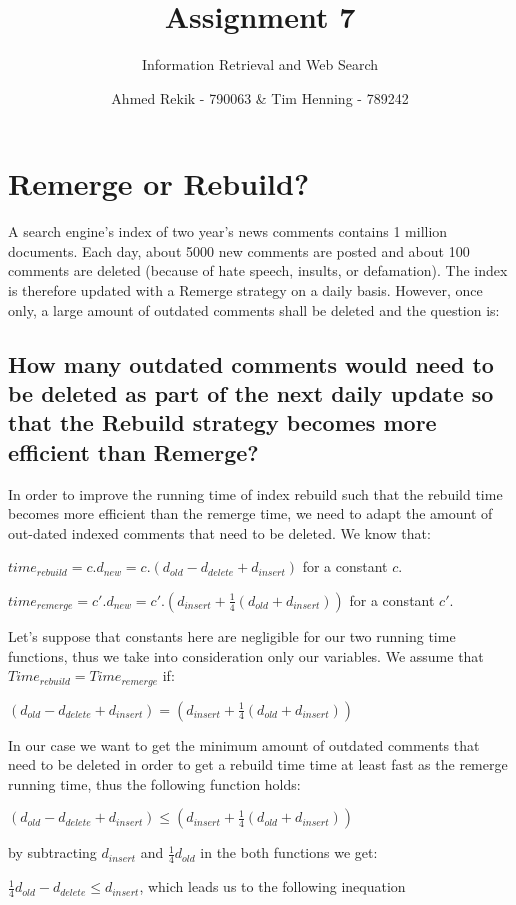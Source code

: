 \documentclass{scrartcl}
\title{Assignment 7}
\subtitle{Information Retrieval and Web Search}
\author{Ahmed Rekik - 790063 \& Tim Henning - 789242}
\begin{document}
\maketitle

\setcounter{section}{0}
\section {Remerge or Rebuild?}
A search engine’s index of two year’s news comments contains 1 million documents. Each day,
about 5000 new comments are posted and about 100 comments are deleted (because of hate
speech, insults, or defamation). The index is therefore updated with a Remerge strategy on a
daily basis. However, once only, a large amount of outdated comments shall be deleted and the
question is:
\subsection{How many outdated comments would need to be deleted as part of the next daily update
so that the Rebuild strategy becomes more efficient than Remerge?}

In order to improve the running time of index rebuild such that the rebuild time becomes more efficient than the remerge time, we need to adapt the amount of out-dated indexed comments that need to be deleted. We know that:

$time_{rebuild} = c.d_{new} = c. ( d_{old} - d_{delete} + d_{insert})$ for a constant $c$.

$time_{remerge} = c'.d_{new} = c'. (d_{insert} + \frac{1}{4}( d_{old} + d_{insert}))$ for a constant $c'$.

Let's suppose that constants here are negligible for our two running time functions, thus we take into consideration only our variables. We assume that 
$Time_{rebuild} = Time_{remerge}$ if:

$(d_{old} - d_{delete} + d_{insert}) = (d_{insert} +  \frac{1}{4} ( d_{old} + d_{insert}))$

In our case we want to get the minimum amount of outdated comments that need to be deleted in order to get a rebuild time time at least fast as the remerge running time, thus the following function holds:

$( d_{old} - d_{delete} + d_{insert}) \leq (d_{insert} + \frac{1}{4}  ( d_{old} + d_{insert}))$

by subtracting $d_{insert}$ and $\frac{1}{4} d_{old}$ in the both functions we get:

$\frac{1}{4} d_{old} - d_{delete} \leq d_{insert}$, which leads us to the following inequation
\end{document}
